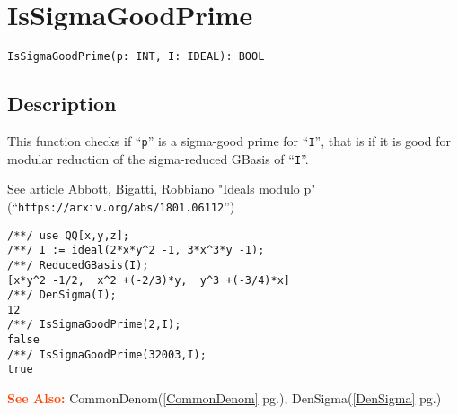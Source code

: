 \documentclass[a4paper]{mybook}
\newenvironment{command}{}{} %
\newcommand\SeeAlso{\par\textcolor{OrangeRed}{\textbf{\large See Also: }}}
\begin{document}
\section{IsSigmaGoodPrime}
\label{IsSigmaGoodPrime}
\begin{command} %


\begin{Verbatim}[label=syntax, rulecolor=\color{MidnightBlue},
frame=single]
IsSigmaGoodPrime(p: INT, I: IDEAL): BOOL
\end{Verbatim}


\subsection*{Description}

This function checks if ``\verb&p&'' is a sigma-good prime for ``\verb&I&'',
that is if it is good for modular reduction of the sigma-reduced
GBasis of ``\verb&I&''.
\par 
See article Abbott, Bigatti, Robbiano
"Ideals modulo p"
(``\verb&https://arxiv.org/abs/1801.06112&'')
\begin{Verbatim}[label=example, rulecolor=\color{PineGreen}, frame=single]
/**/ use QQ[x,y,z];
/**/ I := ideal(2*x*y^2 -1, 3*x^3*y -1);
/**/ ReducedGBasis(I);
[x*y^2 -1/2,  x^2 +(-2/3)*y,  y^3 +(-3/4)*x]
/**/ DenSigma(I);
12
/**/ IsSigmaGoodPrime(2,I);
false
/**/ IsSigmaGoodPrime(32003,I);
true
\end{Verbatim}


\SeeAlso %
  CommonDenom(\ref{CommonDenom} pg.\pageref{CommonDenom}), 
    DenSigma(\ref{DenSigma} pg.\pageref{DenSigma})
\end{command} %
\end{document}
